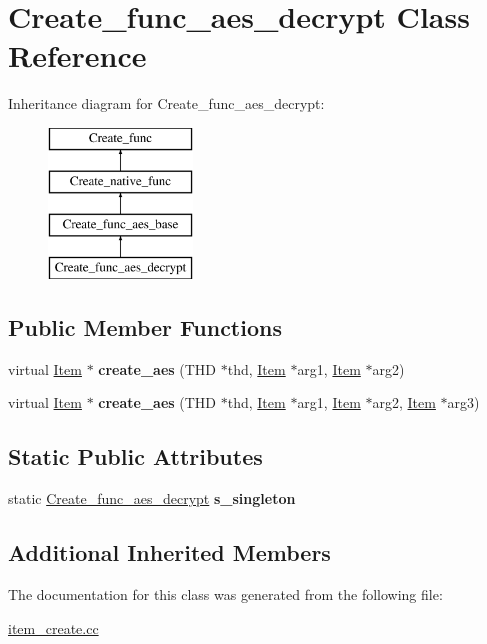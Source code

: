 \hypertarget{classCreate__func__aes__decrypt}{}\section{Create\+\_\+func\+\_\+aes\+\_\+decrypt Class Reference}
\label{classCreate__func__aes__decrypt}
Inheritance diagram for Create\+\_\+func\+\_\+aes\+\_\+decrypt\+:\begin{figure}[H]
\begin{center}
\leavevmode
\includegraphics[height=4.000000cm]{classCreate__func__aes__decrypt}
\end{center}
\end{figure}
\subsection*{Public Member Functions}
\begin{DoxyCompactItemize}
\item 
\mbox{\label{classCreate__func__aes__decrypt_a0dbbda71db741d72c47431bcf3c1cc09}} 
virtual \mbox{\hyperlink{classItem}{Item}} $\ast$ {\bfseries create\+\_\+aes} (T\+HD $\ast$thd, \mbox{\hyperlink{classItem}{Item}} $\ast$arg1, \mbox{\hyperlink{classItem}{Item}} $\ast$arg2)
\item 
\mbox{\label{classCreate__func__aes__decrypt_a23973d7a3d0f88b995b046ee2b1a712c}} 
virtual \mbox{\hyperlink{classItem}{Item}} $\ast$ {\bfseries create\+\_\+aes} (T\+HD $\ast$thd, \mbox{\hyperlink{classItem}{Item}} $\ast$arg1, \mbox{\hyperlink{classItem}{Item}} $\ast$arg2, \mbox{\hyperlink{classItem}{Item}} $\ast$arg3)
\end{DoxyCompactItemize}
\subsection*{Static Public Attributes}
\begin{DoxyCompactItemize}
\item 
\mbox{\label{classCreate__func__aes__decrypt_a3fda628ff35e39ccecbf32a64562c3e6}} 
static \mbox{\hyperlink{classCreate__func__aes__decrypt}{Create\+\_\+func\+\_\+aes\+\_\+decrypt}} {\bfseries s\+\_\+singleton}
\end{DoxyCompactItemize}
\subsection*{Additional Inherited Members}


The documentation for this class was generated from the following file\+:\begin{DoxyCompactItemize}
\item 
\mbox{\hyperlink{item__create_8cc}{item\+\_\+create.\+cc}}\end{DoxyCompactItemize}
